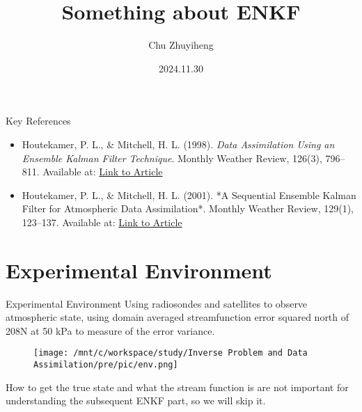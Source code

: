 \documentclass{beamer}
\author{Chu Zhuyiheng}
\title{Something about ENKF}
\institute{OrangeUser}
\date{2024.11.30}
\begin{document}
\begin{frame}
    \titlepage
\end{frame}

\begin{frame}
    \tableofcontents[sectionstyle=show,subsectionstyle=show/shaded/hide,subsubsectionstyle=show/shaded/hide]
\end{frame}

\begin{frame}{Key References}
    \begin{itemize}
        \item Houtekamer, P. L., \& Mitchell, H. L. (1998). \textit{Data Assimilation Using an Ensemble Kalman Filter Technique}. Monthly Weather Review, 126(3), 796–811.  
        Available at: \href{https://journals.ametsoc.org/view/journals/mwre/126/3/1520-0493_1998_126_0796_dauaek_2.0.co_2.xml}{Link to Article}

        \item Houtekamer, P. L., \& Mitchell, H. L. (2001). *A Sequential Ensemble Kalman Filter for Atmospheric Data Assimilation*. Monthly Weather Review, 129(1), 123–137.  
        Available at: \href{https://journals.ametsoc.org/view/journals/mwre/129/1/1520-0493_2001_129_0123_asekff_2.0.co_2.xml}{Link to Article}
    \end{itemize}
\end{frame}

\section{Experimental Environment}
\begin{frame}{Experimental Environment}
    Using radiosondes and satellites to observe atmospheric state, using domain averaged streamfunction error squared north of 208N at 50 kPa to measure of the error variance.
    \begin{figure}[htbp]
        \centering
            \texttt{[image: /mnt/c/workspace/study/Inverse Problem and Data Assimilation/pre/pic/env.png]} %
      \end{figure}
    How to get the true state and what the stream function is are not important for understanding the subsequent ENKF part, so we will skip it.
\end{frame}
\end{document}
